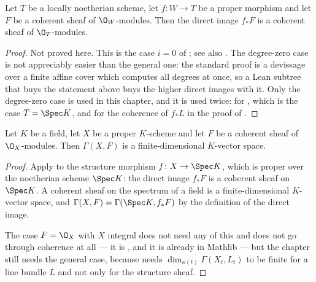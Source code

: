 \begin{proposition}
\label{prop:cube-proper-pushforward-coherent}
Let $T$ be a locally noetherian scheme, let $f\colon W\to T$ be a proper
morphism and let $F$ be a coherent sheaf of $\O_W$-modules.  Then the direct
image $f_*F$ is a coherent sheaf of $\O_T$-modules.
\end{proposition}
\begin{proof}
Not proved here.  This is the case $i=0$ of ; see also
\cite[III, \S8]{Hartshorne}.  The degree-zero case is not appreciably easier
than the general one: the standard proof is a devissage over a finite affine
cover which computes all degrees at once, so a Lean subtree that buys the
statement above buys the higher direct images with it.  Only the degree-zero
case is used in this chapter, and it is used twice: for
, which is the case $T=\Spec K$, and for
the coherence of $f_*L$ in the proof of
.
\end{proof}

\begin{proposition}
\label{prop:cube-coherent-finiteness}
Let $K$ be a field, let $X$ be a proper $K$-scheme and let $F$ be a coherent
sheaf of $\O_X$-modules.  Then $\Gamma(X,F)$ is a finite-dimensional
$K$-vector space.
\end{proposition}
\begin{proof}
Apply  to the structure morphism
$f\colon X\to\Spec K$, which is proper over the noetherian scheme $\Spec K$:
the direct image $f_*F$ is a coherent sheaf on $\Spec K$.  A coherent sheaf on
the spectrum of a field is a finite-dimensional $K$-vector space, and
$\Gamma(X,F)=\Gamma(\Spec K,f_*F)$ by the definition of the direct image.

The case $F=\O_X$ with $X$ integral does not need any of this and does not go
through coherence at all --- it is , and it is
already in Mathlib --- but the chapter still needs the general case, because
 needs $\dim_{\kappa(t)}\Gamma(X_t,L_t)$ to be
finite for a line bundle $L$ and not only for the structure sheaf.
\end{proof}

